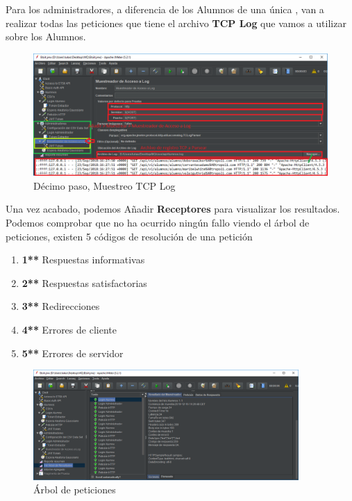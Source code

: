 \documentclass[12pt,a4paper]{article}
\begin{document}
	Para los administradores, a diferencia de los Alumnos de una única , van a realizar todas las peticiones que tiene el archivo \textbf{TCP Log} que vamos a utilizar sobre los Alumnos.
	

	\begin{figure}[h]
		\centering
		\includegraphics[width=1.0\textwidth]{images/step-10.png}
		\caption{Décimo paso, Muestreo TCP Log}
	\end{figure}
	\newpage
	Una vez acabado, podemos Añadir \textbf{Receptores} para visualizar los resultados.
	Podemos comprobar que no ha ocurrido ningún fallo viendo el árbol de peticiones, existen 5 códigos de resolución de una petición
	\begin{enumerate}
		\item {\color{info}\textbf{1**}} Respuestas informativas
		\item {\color{ok}\textbf{2**}} Respuestas satisfactorias
		\item {\color{redirection}\textbf{3**}} Redirecciones
		\item {\color{bad}\textbf{4**}} Errores de cliente
		\item {\color{bad}\textbf{5**}} Errores de servidor
	\end{enumerate}
	
	\begin{figure}[h]
		\centering
		\includegraphics[width=0.9\textwidth]{images/tree-results.png}
		\caption{Árbol de peticiones}
	\end{figure}
\end{document}
